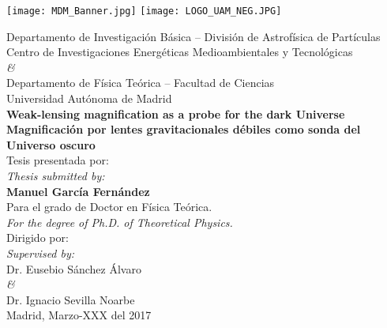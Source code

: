 \newpage
\thispagestyle{empty}
\begin{center}

\texttt{[image: MDM\_Banner.jpg]}
\texttt{[image: LOGO\_UAM\_NEG.JPG]}

\vspace{1cm}
Departamento de Investigaci\'on B\'asica -- Divisi\'on de Astrof\'isica de Part\'iculas\\
Centro de Investigaciones Energ\'eticas Medioambientales y Tecnol\'ogicas\\
\vspace{0.3cm}
{\it \&}\\
\vspace{0.3cm}
Departamento de F\'isica Te\'orica -- Facultad de Ciencias\\
Universidad Aut\'onoma de Madrid\\
\vspace{2cm}
{\bf \LARGE Weak-lensing magnification as a probe for the dark Universe}\\
\vspace{1cm}
{\bf \LARGE Magnificaci\'on por lentes gravitacionales d\'ebiles como sonda del Universo oscuro}\\
\vspace{2cm}
Tesis presentada por:\\{\it Thesis submitted by:}\\
{\bf Manuel Garc\'ia Fern\'andez}\\
Para el grado de Doctor en F\'isica Te\'orica.\\{\it For the degree of Ph.D. of Theoretical Physics.}\\
\vspace{1cm}
Dirigido por:\\
{\it Supervised by:}\\
Dr. Eusebio S\'anchez \'Alvaro\\
{\it \&}\\
Dr. Ignacio Sevilla Noarbe\\
\vspace{1cm}
Madrid, Marzo-XXX del 2017

\end{center}